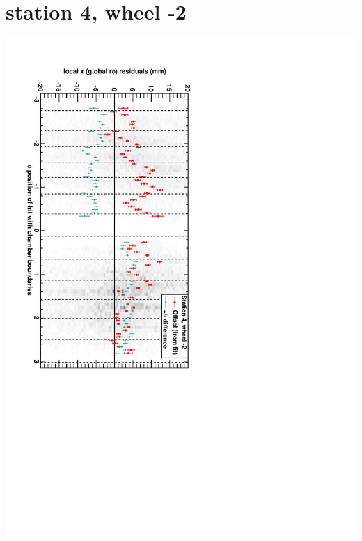\documentclass[compress]{beamer}
\begin{document}
\section*{station 4, wheel -2}
\begin{frame} \vfill \mbox{\hspace{-1 cm}\includegraphics[height=1.2\linewidth, angle=90]{DTrphiVsPhi_st4_whA.pdf}} \end{frame}
\end{document}
